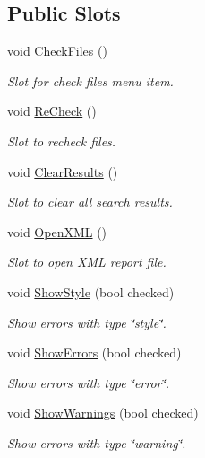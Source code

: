 \subsection*{Public Slots}
\begin{DoxyCompactItemize}
\item 
void \hyperlink{class_main_window_a958b9066965b41c2fd6c0cfb9f4df2d7}{Check\-Files} ()
\begin{DoxyCompactList}\small\item\em Slot for check files menu item. \end{DoxyCompactList}\item 
void \hyperlink{class_main_window_afb8056a0506f4d04dfd9ab1a28b168df}{Re\-Check} ()
\begin{DoxyCompactList}\small\item\em Slot to recheck files. \end{DoxyCompactList}\item 
void \hyperlink{class_main_window_a1a68d1a4326ed87c37d40e7e56a96643}{Clear\-Results} ()
\begin{DoxyCompactList}\small\item\em Slot to clear all search results. \end{DoxyCompactList}\item 
void \hyperlink{class_main_window_a37dbc2a8ee1528106f38492d652b60df}{Open\-X\-M\-L} ()
\begin{DoxyCompactList}\small\item\em Slot to open X\-M\-L report file. \end{DoxyCompactList}\item 
void \hyperlink{class_main_window_a578966abbeaa3d35c5f9cbcc43e31b08}{Show\-Style} (bool checked)
\begin{DoxyCompactList}\small\item\em Show errors with type \char`\"{}style\char`\"{}. \end{DoxyCompactList}\item 
void \hyperlink{class_main_window_ab8865aea8651614b30f816feef2bd9d4}{Show\-Errors} (bool checked)
\begin{DoxyCompactList}\small\item\em Show errors with type \char`\"{}error\char`\"{}. \end{DoxyCompactList}\item 
void \hyperlink{class_main_window_a6e6e6545e4199f1280e4ce5da6c9a226}{Show\-Warnings} (bool checked)
\begin{DoxyCompactList}\small\item\em Show errors with type \char`\"{}warning\char`\"{}. \end{DoxyCompactList}\item 

\end{DoxyCompactItemize}
